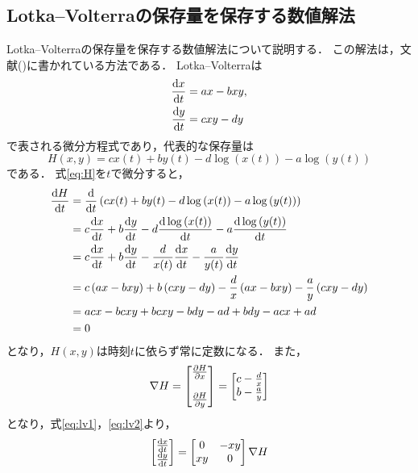 \subsection{Lotka--Volterraの保存量を保存する数値解法}
Lotka--Volterraの保存量を保存する数値解法について説明する．
この解法は，文献(\cite{BB02105565})に書かれている方法である．
Lotka--Volterraは
\begin{align}
    \label{eq:lv1}
    \frac{\mathrm{d}x}{\mathrm{d}t} &= a x - b xy,\\
    \label{eq:lv2}
    \frac{\mathrm{d}y}{\mathrm{d}t} &= c xy - d y
\end{align}
で表される微分方程式であり，代表的な保存量は
\begin{equation}
    \label{eq:H}
    H(x,y) = cx(t) + by(t) - d\log\left(x(t)\right) - a\log\left(y(t)\right)
\end{equation}
である．
式\eqref{eq:H}を$t$で微分すると，
\begin{align*}
    \frac{\mathrm{d}H}{\mathrm{d}t} &= \frac{\mathrm{d}}{\mathrm{d}t}\left(cx(t) + by(t) - d\log\left(x(t)\right) - a\log\left(y(t)\right)\right) \\
    &= c\frac{\mathrm{d}x}{\mathrm{d}t} + b\frac{\mathrm{d}y}{\mathrm{d}t} - d\frac{\mathrm{d}\log\left(x(t)\right)}{\mathrm{d}t} - a\frac{\mathrm{d}\log\left(y(t)\right)}{\mathrm{d}t} \\
    &= c\frac{\mathrm{d}x}{\mathrm{d}t} + b\frac{\mathrm{d}y}{\mathrm{d}t} - \frac{d}{x(t)}\frac{\mathrm{d}x}{\mathrm{d}t} - \frac{a}{y(t)}\frac{\mathrm{d}y}{\mathrm{d}t} \\
    &= c\left(ax - bxy\right) + b\left(cxy - dy\right) - \frac{d}{x}\left(ax - bxy\right) - \frac{a}{y}\left(cxy - dy\right) \\
    &= acx - bcxy + bcxy - bdy - ad + bdy - acx + ad \\
    &= 0
\end{align*}
となり，$H(x,y)$は時刻$t$に依らず常に定数になる．
また，
\begin{align}
    \nabla H = \begin{bmatrix}
        \frac{\partial H}{\partial x} \\  \\
        \frac{\partial H}{\partial y}
    \end{bmatrix} =
    \begin{bmatrix}
        c - \frac{d}{x} \\
        b - \frac{a}{y}
    \end{bmatrix}
\end{align}
となり，式\eqref{eq:lv1}，\eqref{eq:lv2}より，
\begin{align}
    \label{eq:lv3}
    \begin{bmatrix}
        \frac{\mathrm{d}x}{\mathrm{d}t} \\ 
        \frac{\mathrm{d}y}{\mathrm{d}t}
    \end{bmatrix}
    = 
    \begin{bmatrix}
        0 & -xy \\
        xy & 0
    \end{bmatrix}
    \nabla H
\end{align}
